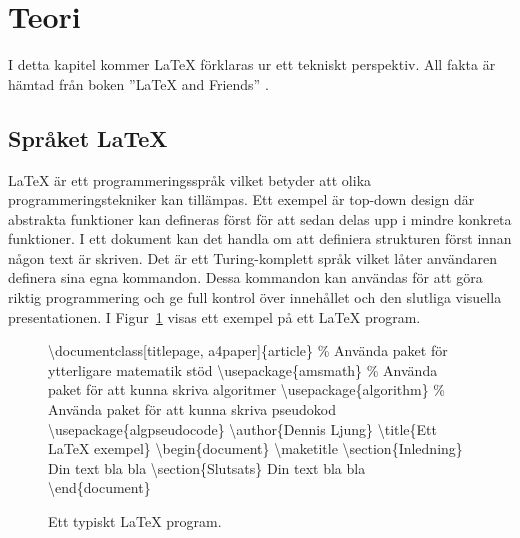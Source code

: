 \section{Teori}
I detta kapitel kommer {\LaTeX} förklaras ur ett tekniskt perspektiv. All fakta är hämtad från boken ''{\LaTeX} and Friends'' \citep{latexandfriends}.

\subsection{Språket {\LaTeX}} 
{\LaTeX} är ett programmeringsspråk vilket betyder att olika programmeringstekniker kan tillämpas. Ett exempel är top-down design där abstrakta funktioner kan defineras först för att sedan delas upp i mindre konkreta funktioner. I ett dokument kan det handla om att definiera strukturen först innan någon text är skriven. 
\newline
\newline
Det är ett Turing-komplett språk vilket låter användaren definera sina egna kommandon. Dessa kommandon kan användas för att göra riktig programmering och ge full kontrol över innehållet och den slutliga visuella presentationen. 
\newline
\newline
I Figur~\ref{fig:latexexempel} visas ett exempel på ett {\LaTeX} program. 
  
\begin{figure}[ht]
	\noindent\makebox[\linewidth]{\rule{\textwidth}{0.4pt}}
	\textbackslash documentclass[titlepage, a4paper]\{article\}
	\newline
	\newline
	\% Använda paket för ytterligare matematik stöd
	\newline
	\textbackslash usepackage\{amsmath\}
	\newline
	\% Använda paket för att kunna skriva algoritmer
	\newline
	\textbackslash usepackage\{algorithm\}
	\newline
	\% Använda paket för att kunna skriva pseudokod
	\newline
	\textbackslash usepackage\{algpseudocode\}
	\newline
	\newline
	\textbackslash author\{Dennis Ljung\}
	\newline
	\textbackslash title\{Ett {\LaTeX} exempel\}
	\newline
	\newline
	\textbackslash begin\{document\}
	\newline
	\textbackslash maketitle
	\newline
	\textbackslash section\{Inledning\}
	\newline
	Din text bla bla
	\newline
	\textbackslash section\{Slutsats\}
	\newline
	Din text bla bla
	\newline
	\textbackslash end\{document\}
	\newline
	\noindent\makebox[\linewidth]{\rule{\textwidth}{0.4pt}}
\caption{Ett typiskt {\LaTeX} program.}
\label{fig:latexexempel}
\end{figure} 

